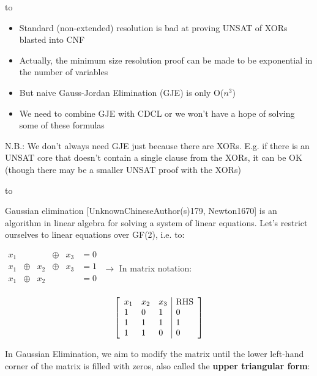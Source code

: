 \documentclass[aspectratio=196]{slides}
\def\TITLE#1{\hbox to \linewidth{\large #1\hfill}}
\def\BOTTOM{\vfill\newpage}
\def\SLIDE#1{\BOTTOM\TITLE{#1}}
\begin{document}
\vfill
\newpage

\SLIDE{Resolution on XOR formulas}

\begin{itemize}
\item Standard (non-extended) resolution is bad at proving UNSAT of XORs blasted into CNF
\item Actually, the minimum size resolution proof can be made to be exponential in the number of variables
\item But naive Gauss-Jordan Elimination (GJE) is only O($n^3$)
\item We need to combine GJE with CDCL or we won't have a hope of solving some of these formulas
\end{itemize}

N.B.: We don't always need GJE just because there are XORs. E.g. if there is an UNSAT core that doesn't contain a single clause from the XORs, it can be OK (though there may be a smaller UNSAT proof with the XORs)


\vfill
\newpage


\SLIDE{Gaussian Elimination}

Gaussian elimination [UnknownChineseAuthor(s)179, Newton1670] is an algorithm in linear algebra for solving a system of linear equations. Let's restrict ourselves to linear equations over GF(2), i.e. to:

$\begin{array}{llllll}
x_1 &&&\oplus &x_3 &= 0\\
x_1 &\oplus &x_2 &\oplus &x_3 &= 1\\
x_1 &\oplus &x_2 &&&= 0\\
\end{array}$
$\rightarrow$ In matrix notation:
\begin{minipage}{0.3\linewidth}
\[
\left[
\begin{array}{lll|l}
x_1 & x_2 & x_3 & $RHS$\\
1 &            0 &           1 & 0\\
1 &            1 &           1 & 1\\
1 &            1 &           0 & 0\\
\end{array}
\right]
\]
\end{minipage}

In Gaussian Elimination, we aim to modify the matrix until the lower left-hand corner of the matrix is filled with zeros, also called the \textbf{upper triangular form}:
\end{document}
